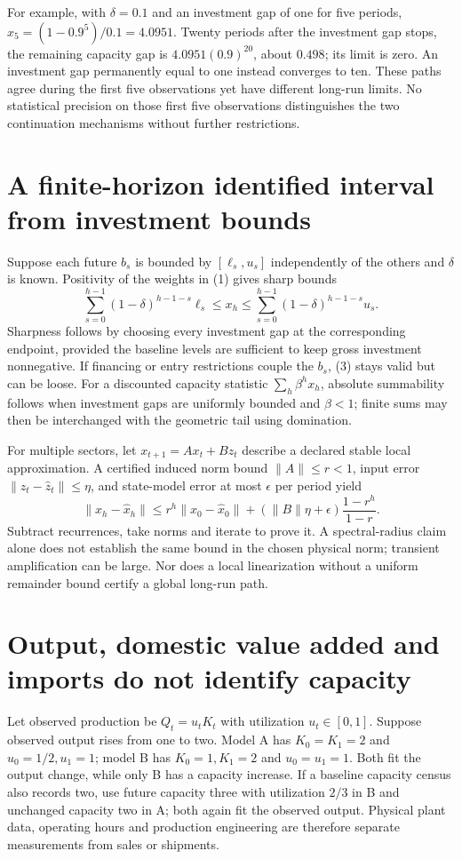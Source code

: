 \documentclass[11pt]{article}
\theoremstyle{definition}
\begin{document}
For example, with $\delta=0.1$ and an investment gap of one for five periods,
$x_5=(1-0.9^5)/0.1=4.0951$. Twenty periods after the investment gap stops,
the remaining capacity gap is $4.0951(0.9)^{20}$, about $0.498$; its limit is
zero. An investment gap permanently equal to one instead converges to ten.
These paths agree during the first five observations yet have different long-run
limits. No statistical precision on those first five observations distinguishes
the two continuation mechanisms without further restrictions.

\section*{A finite-horizon identified interval from investment bounds}
Suppose each future $b_s$ is bounded by $[\ell_s,u_s]$ independently of the
others and $\delta$ is known. Positivity of the weights in (1) gives sharp bounds
\[
 \sum_{s=0}^{h-1}(1-\delta)^{h-1-s}\ell_s
 \le x_h\le
 \sum_{s=0}^{h-1}(1-\delta)^{h-1-s}u_s.                  \tag{3}
\]
Sharpness follows by choosing every investment gap at the corresponding endpoint,
provided the baseline levels are sufficient to keep gross investment nonnegative.
If financing or entry restrictions couple the $b_s$, (3) stays valid but can be
loose. For a discounted capacity statistic $\sum_h\beta^h x_h$, absolute
summability follows when investment gaps are uniformly bounded and $\beta<1$;
finite sums may then be interchanged with the geometric tail using domination.

For multiple sectors, let $x_{t+1}=Ax_t+Bz_t$ describe a declared stable local
approximation. A certified induced norm bound $\|A\|\le r<1$, input error
$\|z_t-\widehat z_t\|\le\eta$, and state-model error at most $\epsilon$
per period yield
\[
 \|x_h-\widehat x_h\|\le r^h\|x_0-\widehat x_0\|
           +(\|B\|\eta+\epsilon)\frac{1-r^h}{1-r}.       \tag{4}
\]
Subtract recurrences, take norms and iterate to prove it. A spectral-radius
claim alone does not establish the same bound in the chosen physical norm;
transient amplification can be large. Nor does a local linearization without
a uniform remainder bound certify a global long-run path.

\section*{Output, domestic value added and imports do not identify capacity}
Let observed production be $Q_t=u_tK_t$ with utilization $u_t\in[0,1]$.
Suppose observed output rises from one to two. Model A has $K_0=K_1=2$ and
$u_0=1/2,u_1=1$; model B has $K_0=1,K_1=2$ and $u_0=u_1=1$.
Both fit the output change, while only B has a capacity increase. If a baseline
capacity census also records two, use future capacity three with utilization
$2/3$ in B and unchanged capacity two in A; both again fit the observed output.
Physical plant data, operating hours and production engineering are therefore
separate measurements from sales or shipments.
\end{document}
